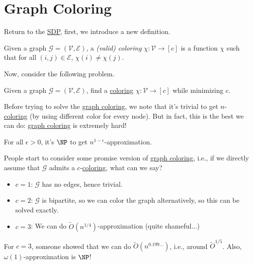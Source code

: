 \section{Graph Coloring}
Return to the \hyperref[def:SDP]{SDP}, first, we introduce a new definition.

\begin{definition}[Coloring]\label{def:coloring}
	Given a graph \(\mathcal{G} =(\mathcal{V} , \mathcal{E} )\), a \emph{(valid) coloring} \(\chi \colon \mathcal{V} \to [c]\) is a function \(\chi \) such that for all \((i, j)\in \mathcal{E} \), \(\chi (i) \neq \chi (j)\).
\end{definition}

Now, consider the following problem.

\begin{problem}\label{prb:graph-coloring}
Given a graph \(\mathcal{G} =(\mathcal{V} , \mathcal{E} )\), find a \hyperref[def:coloring]{coloring} \(\chi \colon \mathcal{V} \to [c]\) while minimizing \(c\).
\end{problem}

Before trying to solve the \hyperref[prb:graph-coloring]{graph coloring}, we note that it's trivial to get \(n\)-\hyperref[def:coloring]{coloring} (by using different color for every node). But in fact, this is the best we can do: \hyperref[prb:graph-coloring]{graph coloring} is extremely hard!

\begin{theorem}
	For all \(\epsilon > 0\), it's \(\NP\) to get \(n^{1 - \epsilon }\)-approximation.
\end{theorem}

People start to consider some promise version of \hyperref[prb:graph-coloring]{graph coloring}, i.e., if we directly assume that \(\mathcal{G} \) admits a \(c\)-\hyperref[def:coloring]{coloring}, what can we say?
\begin{itemize}
	\item \(c = 1\): \(\mathcal{G} \) has no edges, hence trivial.
	\item \(c = 2\): \(\mathcal{G} \) is bipartite, so we can color the graph alternatively, so this can be solved exactly.
	\item \(c = 3\): We can do \(\widetilde{O} (n^{1 / 4})\)-approximation (quite shameful...)
\end{itemize}
\begin{remark}[SOTA for \(c=3\)]
	For \(c = 3\), someone showed that we can do \(\widetilde{O} (n^{0.199\ldots  })\), i.e., around \(\widetilde{O} ^{1 / 5}\). Also, \(\omega (1)\)-approximation is \(\NP\)!
\end{remark}

